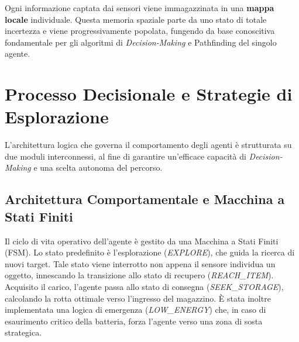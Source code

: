 \documentclass[11pt,a4paper]{article}
\begin{document}
\vspace{0.3cm}
\noindent
Ogni informazione captata dai sensori viene immagazzinata in una \textbf{mappa locale} individuale. Questa memoria spaziale parte da uno stato di totale incertezza e viene progressivamente popolata, fungendo da base conoscitiva fondamentale per gli algoritmi di \textit{Decision-Making} e Pathfinding del singolo agente.

\section{Processo Decisionale e Strategie di Esplorazione}
L'architettura logica che governa il comportamento degli agenti è strutturata su due moduli interconnessi, al fine di garantire un'efficace capacità di \textit{Decision-Making} e una scelta autonoma del percorso.

\subsection{Architettura Comportamentale e Macchina a Stati Finiti}
Il ciclo di vita operativo dell'agente è gestito da una Macchina a Stati Finiti (FSM). Lo stato predefinito è l'esplorazione (\textit{EXPLORE}), che guida la ricerca di nuovi target. Tale stato viene interrotto non appena il sensore individua un oggetto, innescando la transizione allo stato di recupero (\textit{REACH\_ITEM}). Acquisito il carico, l'agente passa allo stato di consegna (\textit{SEEK\_STORAGE}), calcolando la rotta ottimale verso l'ingresso del magazzino. È stata inoltre implementata una logica di emergenza (\textit{LOW\_ENERGY}) che, in caso di esaurimento critico della batteria, forza l'agente verso una zona di sosta strategica.
\end{document}
